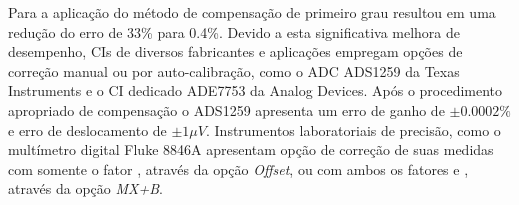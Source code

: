 		Para \textcite{spoonkillervideo} a aplicação do método de compensação de primeiro grau resultou em uma redução do erro de 33\% para 0.4\%. Devido a esta significativa melhora de desempenho, CIs de diversos fabricantes e aplicações empregam opções de correção manual ou por auto-calibração, como o ADC ADS1259 da Texas Instruments\textsuperscript{\textregistered} e o CI dedicado ADE7753 da Analog Devices\textsuperscript{\textregistered}. Após o procedimento apropriado de compensação o ADS1259 apresenta um erro de ganho de $\pm 0.0002\%$ e erro de deslocamento de $\pm 1\mu V$. Instrumentos laboratoriais de precisão, como o multímetro digital Fluke\textsuperscript{\textregistered} 8846A apresentam opção de correção de suas medidas com somente o fator , através da opção \textit{Offset}, ou com ambos os fatores  e , através da opção \textit{MX+B}.


